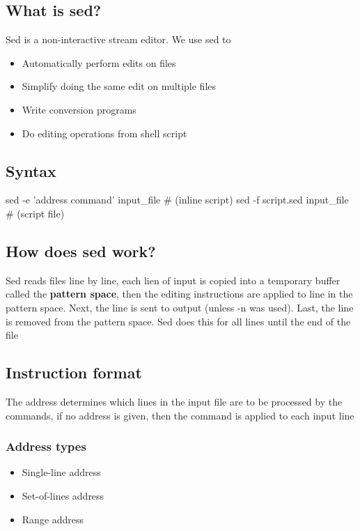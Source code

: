 \documentclass{report}
\begin{document}
    \pagebreak 
    \bigbreak \noindent 
    \subsection{What is sed?}
    \bigbreak \noindent 
    Sed is a non-interactive stream editor. We use sed to 
    \begin{itemize}
        \item Automatically perform edits on files
        \item Simplify doing the same edit on multiple files
        \item Write conversion programs
        \item Do editing operations from shell script
    \end{itemize}
    \bigbreak \noindent 
    \subsection{Syntax}
    \bigbreak \noindent 
    \begin{bashcode}
    sed -e 'address command' input_file # (inline script)
    sed -f script.sed input_file # (script file)
    \end{bashcode}
    \bigbreak \noindent 
    \subsection{How does sed work? }
    \bigbreak \noindent 
    Sed reads files line by line, each lien of input is copied into a temporary buffer called the \textbf{pattern space}, then the editing instructions are applied to line in the pattern space. Next, the line is sent to output (unless -n was used). Last, the line is removed from the pattern space. Sed does this for all lines until the end of the file
    \bigbreak \noindent 

    \bigbreak \noindent 
    \subsection{Instruction format}
    \bigbreak \noindent 
    \bigbreak \noindent 
    The address determines which lines in the input file are to be processed by the commands, if no address is given, then the command is applied to each input line
    \bigbreak \noindent 
    \subsubsection{Address types}
    \begin{itemize}
        \item Single-line address
        \item Set-of-lines address
        \item Range address
    \end{itemize}
    \bigbreak \noindent 
\end{document}
